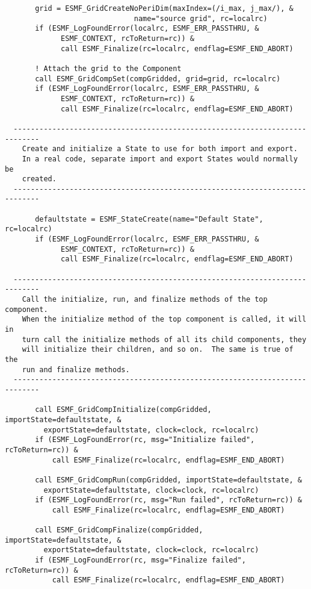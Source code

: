 \begin{verbatim}
       grid = ESMF_GridCreateNoPeriDim(maxIndex=(/i_max, j_max/), &
                              name="source grid", rc=localrc)
       if (ESMF_LogFoundError(localrc, ESMF_ERR_PASSTHRU, &
             ESMF_CONTEXT, rcToReturn=rc)) &
             call ESMF_Finalize(rc=localrc, endflag=ESMF_END_ABORT)
 
       ! Attach the grid to the Component
       call ESMF_GridCompSet(compGridded, grid=grid, rc=localrc)
       if (ESMF_LogFoundError(localrc, ESMF_ERR_PASSTHRU, &
             ESMF_CONTEXT, rcToReturn=rc)) &
             call ESMF_Finalize(rc=localrc, endflag=ESMF_END_ABORT)
 
  ----------------------------------------------------------------------------
    Create and initialize a State to use for both import and export.
    In a real code, separate import and export States would normally be
    created.
  ----------------------------------------------------------------------------
 
       defaultstate = ESMF_StateCreate(name="Default State", rc=localrc)
       if (ESMF_LogFoundError(localrc, ESMF_ERR_PASSTHRU, &
             ESMF_CONTEXT, rcToReturn=rc)) &
             call ESMF_Finalize(rc=localrc, endflag=ESMF_END_ABORT)
 
  ----------------------------------------------------------------------------
    Call the initialize, run, and finalize methods of the top component.
    When the initialize method of the top component is called, it will in
    turn call the initialize methods of all its child components, they
    will initialize their children, and so on.  The same is true of the
    run and finalize methods.
  ----------------------------------------------------------------------------
 
       call ESMF_GridCompInitialize(compGridded, importState=defaultstate, &
         exportState=defaultstate, clock=clock, rc=localrc)
       if (ESMF_LogFoundError(rc, msg="Initialize failed", rcToReturn=rc)) &
           call ESMF_Finalize(rc=localrc, endflag=ESMF_END_ABORT)
 
       call ESMF_GridCompRun(compGridded, importState=defaultstate, &
         exportState=defaultstate, clock=clock, rc=localrc)
       if (ESMF_LogFoundError(rc, msg="Run failed", rcToReturn=rc)) &
           call ESMF_Finalize(rc=localrc, endflag=ESMF_END_ABORT)
 
       call ESMF_GridCompFinalize(compGridded, importState=defaultstate, &
         exportState=defaultstate, clock=clock, rc=localrc)
       if (ESMF_LogFoundError(rc, msg="Finalize failed", rcToReturn=rc)) &
           call ESMF_Finalize(rc=localrc, endflag=ESMF_END_ABORT)
 

\end{verbatim}
